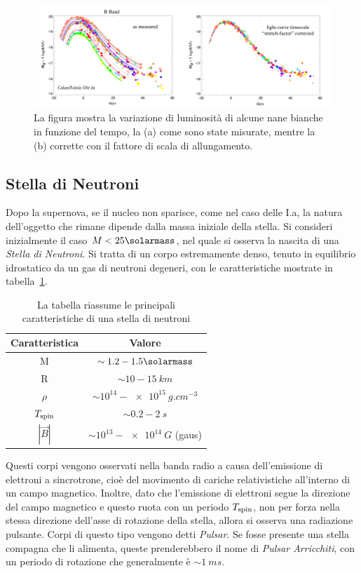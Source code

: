 \begin{figure}
    \centering
    \includegraphics[width = \textwidth]{immagini/stretch_hammuy.png}
    \caption{La figura mostra la variazione di luminosità di alcune nane bianche in funzione del tempo, la (a) come sono state misurate, mentre la (b) corrette con il fattore di scala di allungamento.}\label{fig:std-candle}
\end{figure}

\subsection{Stella di Neutroni}\label{sec:stella-neutroni}
Dopo la supernova, se il nucleo non sparisce, come nel caso delle I.a, la natura dell'oggetto che rimane dipende dalla massa iniziale della stella. Si consideri inizialmente il caso $M < 25\si{\solarmass}$, nel quale si osserva la nascita di una \emph{Stella di Neutroni}. Si tratta di un corpo estremamente denso, tenuto in equilibrio idrostatico da un gas di neutroni degeneri, con le caratteristiche mostrate in tabella~\ref{tab:neutron-star}.
\begin{table}
    \centering
    \caption{La tabella riassume le principali caratteristiche di una stella di neutroni}\label{tab:neutron-star}
    \begin{tabular}{c|c}
        \toprule
        Caratteristica & Valore\\
        \midrule
        M&$\sim 1.2 - 1.5 \si{\solarmass}$ \\
        R&$\sim 10 - \SI{15}{km}$ \\
        $\rho$&$\sim 10^{14} - \SI{e15}{g.cm^{-3}}$ \\
        $T_\textup{spin}$& $\sim 0.2 - \SI{2}{s}$ \\
        $|\vec{B}|$& $\sim 10^{13} - \SI{e14}{G}$ (gaus)\\
        \bottomrule
    \end{tabular}
\end{table}

Questi corpi vengono osservati nella banda radio a causa dell'emissione di elettroni a sincrotrone, cioè del movimento di cariche relativistiche all'interno di un campo magnetico. Inoltre, dato che l'emissione di elettroni segue la direzione del campo magnetico e questo ruota con un periodo $T_\textup{spin}$, non per forza nella stessa direzione dell'asse di rotazione della stella, allora si osserva una radiazione pulsante. Corpi di questo tipo vengono detti \emph{Pulsar}. Se fosse presente una stella compagna che li alimenta, queste prenderebbero il nome di \emph{Pulsar Arricchiti}, con un periodo di rotazione che generalmente è $\sim \SI{1}{ms}$.

